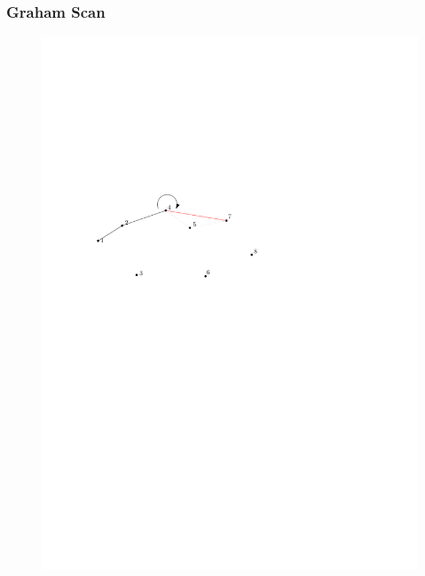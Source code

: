 \begin{frame}
	\frametitle{{Graham Scan}}
\begin{figure}[htbp]
	\begin{center}
  	\includegraphics[width=.8\linewidth]{bilder/graham8}
	\end{center}
\end{figure}
\end{frame}

